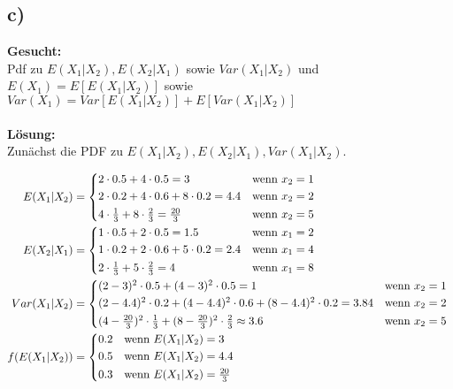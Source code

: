 \documentclass{article}
\begin{document}
\subsection*{c)}
\textbf{Gesucht:}\\

Pdf zu $E(X_1|X_2), E(X_2|X_1)$ sowie $Var(X_1|X_2)$ und $E(X_1) = E[E(X_1|X_2)]$ sowie $Var(X_1) = Var[E(X_1|X_2)] + E[Var(X_1|X_2)]$ \\ \\
\textbf{Lösung:}\\

Zunächst die PDF zu $E(X_1|X_2), E(X_2|X_1), Var(X_1|X_2)$.

\begin{align*}
    E(X_1|X_2)&= \begin{cases*}
        2 \cdot 0.5 + 4 \cdot 0.5  = 3 & wenn $x_2 = 1$ \\
        2\cdot 0.2 + 4 \cdot 0.6 + 8 \cdot 0.2 = 4.4 & wenn $x_2 = 2$ \\
        4 \cdot \frac{1}{3} + 8 \cdot \frac{2}{3} = \frac{20}{3} & wenn $x_2 = 5$       
    \end{cases*}\\
    E(X_2|X_1) &= \begin{cases*}
        1 \cdot 0.5 + 2 \cdot 0.5 = 1.5 & wenn $ x_1 = 2$ \\
        1 \cdot 0.2 + 2 \cdot 0.6 + 5 \cdot 0.2 = 2.4 & wenn $x_1 = 4$ \\
        2 \cdot \frac{1}{3} + 5 \cdot \frac{2}{3} = 4 & wenn $x_1 = 8$ 
    \end{cases*}\\
    Var(X_1|X_2) &= \begin{cases*}
        (2 - 3)^2 \cdot 0.5 + (4-3)^2 \cdot 0.5 = 1 & wenn $x_2 = 1$ \\
        (2-4.4)^2 \cdot 0.2 + (4- 4.4)^2 \cdot 0.6 + (8-4.4)^2 \cdot 0.2 = 3.84& wenn $x_2 = 2$ \\
        (4 - \frac{20}{3})^2 \cdot \frac{1}{3} + (8 - \frac{20}{3})^2 \cdot \frac{2}{3} \approx 3.6 & wenn $x_2 = 5$
    \end{cases*}\\
    f(E(X_1|X_2)) &= \begin{cases*}
        0.2 & wenn $E(X_1|X_2) = 3$\\
        0.5 & wenn $E(X_1|X_2) = 4.4$ \\
        0.3 & wenn $E(X_1|X_2) = \frac{20}{3}$
    \end{cases*} \\

\end{align*}
\end{document}
